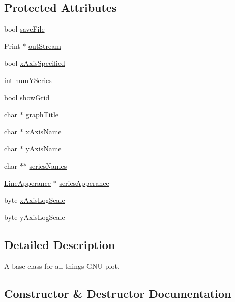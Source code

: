 \subsection*{Protected Attributes}
\begin{DoxyCompactItemize}
\item 
bool \hyperlink{class_serial_graph_a24202e0a7a8bac5ec1cfd92bf796e078}{save\+File}
\item 
Print $\ast$ \hyperlink{class_serial_graph_aec32289a9393e98bf80d44406e5c207d}{out\+Stream}
\item 
bool \hyperlink{class_serial_graph_a4dbd9cf190c591fb4f2f46a50d937199}{x\+Axis\+Specified}
\item 
int \hyperlink{class_serial_graph_ab40c430e06102b9624736173d4a58596}{num\+Y\+Series}
\item 
bool \hyperlink{class_serial_graph_ad61d5ea29eacc1611c5addc94714f1e2}{show\+Grid}
\item 
char $\ast$ \hyperlink{class_serial_graph_a0b33d43c2bb54340ef1f90b5f76d7aea}{graph\+Title}
\item 
char $\ast$ \hyperlink{class_serial_graph_a5f5bf85ed361ff567d0888eaa73e269c}{x\+Axis\+Name}
\item 
char $\ast$ \hyperlink{class_serial_graph_a08452a56c74ec5f5473b64605d555339}{y\+Axis\+Name}
\item 
char $\ast$$\ast$ \hyperlink{class_serial_graph_a2307e40e27249f44bbe14776dc68c561}{series\+Names}
\item 
\hyperlink{struct_line_apperance}{Line\+Apperance} $\ast$ \hyperlink{class_serial_graph_a8d743f9eeeca69a988d2159a405e4253}{series\+Apperance}
\item 
byte \hyperlink{class_serial_graph_afc2ca72fdfe2bc5e3159c9e910a8f81e}{x\+Axis\+Log\+Scale}
\item 
byte \hyperlink{class_serial_graph_a1f0424857ec14c176747b3ddb0768eee}{y\+Axis\+Log\+Scale}
\end{DoxyCompactItemize}


\subsection{Detailed Description}
A base class for all things G\+N\+U plot. 

\subsection{Constructor \& Destructor Documentation}
\hypertarget{class_g_n_u_plot_base_aee6453a84c4357b1fcde2f14b455423f}{}
